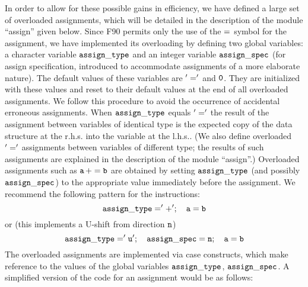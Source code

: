 In order to allow for these possible gains in efficiency, we have defined
a large set of overloaded assignments, which will be detailed in the
description of the module ``assign'' given below.  Since F90 permits
only the use of the $\tt =$ symbol for the assignment, we have implemented
its overloading by defining two global variables: a character variable
$\tt assign\_type$ and an integer variable $\tt assign\_spec$ (for assign
specification, introduced to accommodate assignments of a more
elaborate nature).  The default values of these variables are $\tt '='$
and $\tt 0$.  They are initialized with these values and reset to
their default values at the end of all overloaded assignments.  We
follow this procedure to avoid the occurrence of accidental erroneous
assignments.  When $\tt assign\_type$ equals  $\tt '='$ the result of
the assignment between variables of identical type is the expected
copy of the data structure at the r.h.s. into the variable at the l.h.s..
(We also define overloaded $\tt '='$ assignments between variables
of different type; the results of such assignments are explained
in the description of the module ``assign''.)  Overloaded
assignments such as $\tt a\,+=b$ are obtained by setting 
$\tt assign\_type$ (and possibly $\tt assign\_spec$) to the appropriate
value immediately before the assignment.  We recommend the following
pattern for the instructions:
%
\begin{equation}
\tt assign\_type='+'; \quad a=b  
\label{asgnone}
\end{equation}
%
or (this implements a U-shift from direction $\tt n$)
%
\begin{equation}
\tt assign\_type='u'; \quad assign\_spec=n;  \quad a=b  
\label{asgntwo}
\end{equation}
%
The overloaded assignments are implemented via case constructs, which
make reference to the values of the global variables $\tt assign\_type$, 
$\tt assign\_spec$.  A simplified version of the code for an assignment
would be as follows:

\vskip 4mm
{\baselineskip 5mm \tt
{}
}


